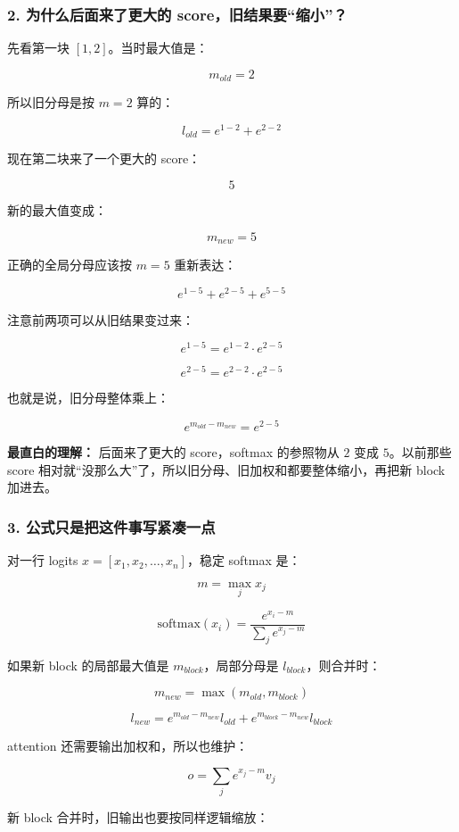 \subsubsection*{2. 为什么后面来了更大的 score，旧结果要“缩小”？}

先看第一块 $[1,2]$。当时最大值是：

\[
m_{old}=2
\]

所以旧分母是按 $m=2$ 算的：

\[
l_{old}=e^{1-2}+e^{2-2}
\]

现在第二块来了一个更大的 score：

\[
5
\]

新的最大值变成：

\[
m_{new}=5
\]

正确的全局分母应该按 $m=5$ 重新表达：

\[
e^{1-5}+e^{2-5}+e^{5-5}
\]

注意前两项可以从旧结果变过来：

\[
e^{1-5}=e^{1-2}\cdot e^{2-5}
\]

\[
e^{2-5}=e^{2-2}\cdot e^{2-5}
\]

也就是说，旧分母整体乘上：

\[
e^{m_{old}-m_{new}}=e^{2-5}
\]

\begin{summarybox}
\textbf{最直白的理解：} 后面来了更大的 score，softmax 的参照物从 $2$ 变成 $5$。以前那些 score 相对就“没那么大”了，所以旧分母、旧加权和都要整体缩小，再把新 block 加进去。
\end{summarybox}

\subsubsection*{3. 公式只是把这件事写紧凑一点}

对一行 logits $x=[x_1,x_2,\dots,x_n]$，稳定 softmax 是：

\[
m=\max_j x_j
\]

\[
\mathrm{softmax}(x_i)=\frac{e^{x_i-m}}{\sum_j e^{x_j-m}}
\]

如果新 block 的局部最大值是 $m_{block}$，局部分母是 $l_{block}$，则合并时：

\[
m_{new}=\max(m_{old},m_{block})
\]

\[
l_{new}
=
e^{m_{old}-m_{new}}l_{old}
+
e^{m_{block}-m_{new}}l_{block}
\]

attention 还需要输出加权和，所以也维护：

\[
o=\sum_j e^{x_j-m}v_j
\]

新 block 合并时，旧输出也要按同样逻辑缩放：


